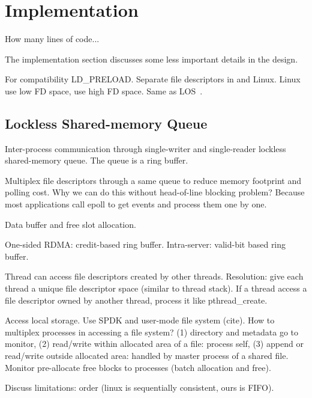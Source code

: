 \section{Implementation}
\label{sec:implementation}

How many lines of code...

The implementation section discusses some less important details in the design.


For compatibility
LD\_PRELOAD.
Separate file descriptors in \sys and Linux. Linux use low FD space, \sys use high FD space. Same as LOS~\cite{huang2017high}.

\subsection{Lockless Shared-memory Queue}
\label{subsec:lockless-queue}

Inter-process communication through single-writer and single-reader lockless shared-memory queue. The queue is a ring buffer.

Multiplex file descriptors through a same queue to reduce memory footprint and polling cost. Why we can do this without head-of-line blocking problem? Because most applications call epoll to get events and process them one by one.

Data buffer and free slot allocation.

One-sided  RDMA: credit-based ring buffer. Intra-server: valid-bit based ring buffer.


Thread can access file descriptors created by other threads. Resolution: give each thread a unique file descriptor space (similar to thread stack). If a thread access a file descriptor owned by another thread, process it like pthread\_create.

Access local storage. Use SPDK and user-mode file system (cite). How to multiplex processes in accessing a file system? (1) directory and metadata go to monitor, (2) read/write within allocated area of a file: process self, (3) append or read/write outside allocated area: handled by master process of a shared file. Monitor pre-allocate free blocks to processes (batch allocation and free).

Discuss limitations: order (linux is sequentially consistent, ours is FIFO).